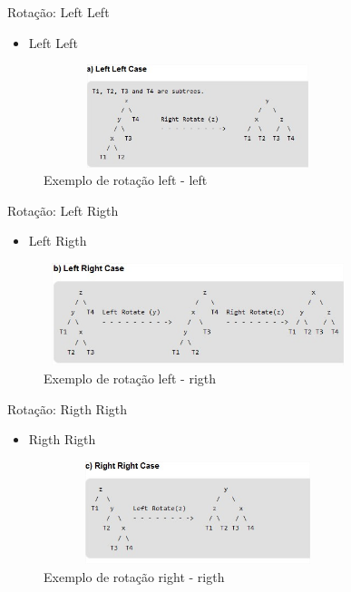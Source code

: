 \begin{frame}
	\begin{block}{Rotação: Left Left}
		\begin{itemize}
			\item Left Left
		\end{itemize}
		\begin{figure}[!htb]
			\centering	  				
			\includegraphics[height=3cm, width = 9cm]{./pic/leftleft.jpg}
			\caption{Exemplo de rotação left - left}
			\label{fig_pilha}
		\end{figure}
	\end{block}
\end{frame}


\begin{frame}
	\begin{block}{Rotação: Left Rigth}
		\begin{itemize}
			\item Left Rigth
		\end{itemize}
		\begin{figure}[!htb]
			\centering	  				
			\includegraphics[height=3cm, width = 9cm]{./pic/leftRigth.jpg}
			\caption{Exemplo de rotação left - rigth}
			\label{fig_pilha}
		\end{figure}
	\end{block}
\end{frame}

\begin{frame}
	\begin{block}{Rotação: Rigth Rigth}
		\begin{itemize}
			\item Rigth Rigth
		\end{itemize}
		\begin{figure}[!htb]
			\centering	  				
			\includegraphics[height=3cm, width = 9cm]{./pic/rigthrigth.jpg}
			\caption{Exemplo de rotação right - rigth}
			\label{fig_pilha}
		\end{figure}
	\end{block}
\end{frame}


